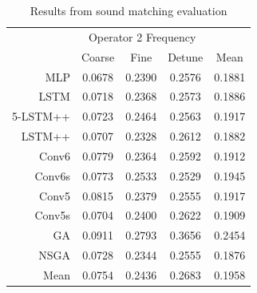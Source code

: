 \begin{table}[p]
\centering
\begin{tabular}{r|ccc|c}
\toprule
{} & \multicolumn{3}{c}{Operator 2 Frequency} & {} \\
{} & Coarse & Fine & Detune & Mean \\
\midrule
MLP      &    0.0678 &  0.2390 &      0.2576 & 0.1881 \\
LSTM     &    0.0718 &  0.2368 &      0.2573 & 0.1886 \\
5-LSTM++ &    0.0723 &  0.2464 &      0.2563 & 0.1917 \\
LSTM++   &    0.0707 &  0.2328 &      0.2612 & 0.1882 \\
Conv6    &    0.0779 &  0.2364 &      0.2592 & 0.1912 \\
Conv6s   &    0.0773 &  0.2533 &      0.2529 & 0.1945 \\
Conv5    &    0.0815 &  0.2379 &      0.2555 & 0.1917 \\
Conv5s   &    0.0704 &  0.2400 &      0.2622 & 0.1909 \\
GA       &    0.0911 &  0.2793 &      0.3656 & 0.2454 \\
NSGA     &    0.0728 &  0.2344 &      0.2555 & 0.1876 \\
\midrule
Mean     &    0.0754 &  0.2436 &      0.2683 & 0.1958 \\
\bottomrule
\end{tabular}
\caption{Results from sound matching evaluation}
\label{tbl:param_eval_osc}
\end{table}


